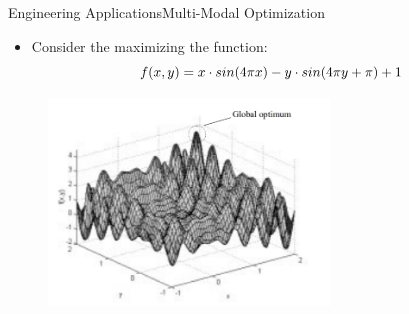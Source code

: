 \begin{frame}{Engineering Applications}{Multi-Modal Optimization}
\begin{itemize}
\item{Consider the maximizing the function:}
\begin{equation} \small{
f(x, y) = x \cdot sin(4 \pi x) - y \cdot sin(4 \pi y + \pi) +1}
 \end{equation}
\end{itemize}
\begin{figure}[h]
\centering
\includegraphics[height=5.5cm]{img/cj_func_maxi.png}
\end{figure}
\end{frame}


